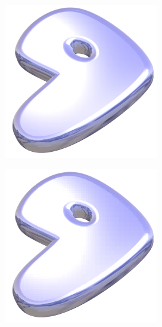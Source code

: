 \begin{figure}
  \centering
  \begin{subfigure}[b]{0.24\textwidth}
    \centering
    \includegraphics[width=\textwidth]{plaatjes/gentoo_haar_0_15.png}
  \end{subfigure}
  \begin{subfigure}[b]{0.24\textwidth}
    \centering
    \includegraphics[width=\textwidth]{plaatjes/gentoo_haar_0_1.png}

\end{subfigure}
\end{figure}
